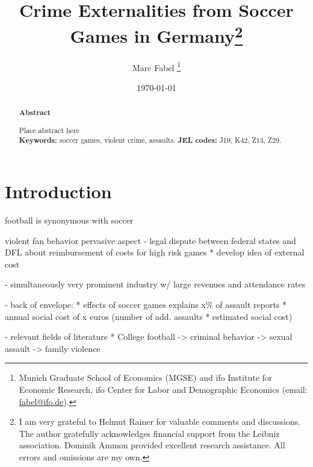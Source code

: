\documentclass[11pt, a4paper]{article} %
\title{Crime Externalities from Soccer Games in Germany\footnote{I am very grateful to Helmut Rainer for valuable comments and discussions. The author gratefully acknowledges financial support from the Leibniz association. Dominik Ammon provided excellent research assistance. All errors and omissions are my own.
}}
\author{
	Marc Fabel 
		\thanks{Munich Graduate School of Economics (MGSE) and ifo Institute for Economic Research, ifo Center for Labor and Demographic Economics (email: \href{mailto:fabel@ifo.de}{fabel@ifo.de}).
		}
}
\date{\monthyeardate\today}
\begin{document}
\setcounter{page}{0}
\newpage
\setcounter{page}{1}
\maketitle


\renewcommand{\abstractname}{\vspace{-\baselineskip}} %
\begin{abstract}\noindent 
	\footnotesize{\begin{center}\textbf{Abstract}\end{center} Place abstract here\\\newline \textbf{Keywords:} soccer games, violent crime, assaults. \newline \textbf{JEL codes:} J19, K42, Z13, Z29.}

\end{abstract}


\newpage
\tableofcontents


\newpage
\section{Introduction}\label{sec_soc_ext:introduction}


football is synonymous with soccer 

violent fan behavior pervasive aspect 
- legal dispute between federal states and DFL about reimbursement of costs for high risk games
	* develop idea of external cost

- simultaneously very prominent industry w/ large revenues and attendance rates




		
- back of envelope: 
	* effects of soccer games explains x\% of assault reports
	* annual social cost of x euros (number of add. assaults * estimated social cost)

- relevant fields of literature
	* College football 
		-> criminal behavior \cite{rees2009college}
		-> sexual assault \cite{lindo2018college}
		-> family violence \cite{card2011family}
		
\end{document}
